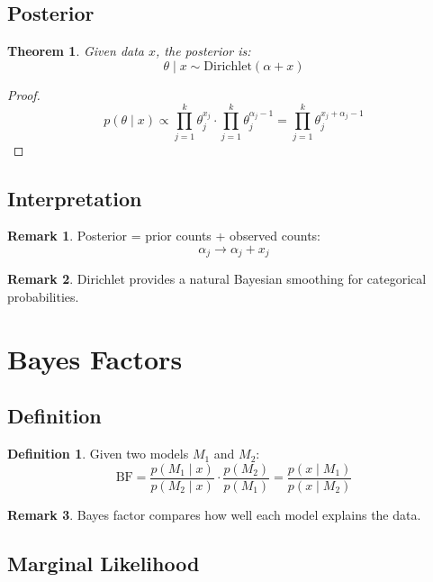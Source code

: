 \documentclass[12pt,oneside]{book}
\numberwithin{equation}{section}
\theoremstyle{definition}
\newtheorem{definition}{Definition}[section]
\newtheorem{remark}{Remark}[section]
\theoremstyle{plain}
\newtheorem{theorem}{Theorem}[section]
\theoremstyle{remark}
\newcommand{\Dir}{\mathrm{Dirichlet}}
\begin{document}
\subsection{Posterior}

\begin{theorem}
Given data $x$, the posterior is:
$$
\theta \mid x \sim \Dir(\alpha + x)
$$
\end{theorem}

\begin{proof}
$$
p(\theta \mid x)
\propto
\prod_{j=1}^k \theta_j^{x_j}
\cdot
\prod_{j=1}^k \theta_j^{\alpha_j - 1}
=
\prod_{j=1}^k \theta_j^{x_j + \alpha_j - 1}
$$
\end{proof}

\subsection{Interpretation}

\begin{remark}
Posterior = prior counts + observed counts:
$$
\alpha_j \rightarrow \alpha_j + x_j
$$
\end{remark}

\begin{remark}
Dirichlet provides a natural Bayesian smoothing for categorical probabilities.
\end{remark}

\section{Bayes Factors}

\subsection{Definition}

\begin{definition}
Given two models $M_1$ and $M_2$:
$$
\text{BF}
=
\frac{p(M_1 \mid x)}{p(M_2 \mid x)}
\cdot
\frac{p(M_2)}{p(M_1)}
=
\frac{p(x \mid M_1)}{p(x \mid M_2)}
$$
\end{definition}

\begin{remark}
Bayes factor compares how well each model explains the data.
\end{remark}

\subsection{Marginal Likelihood}
\end{document}
